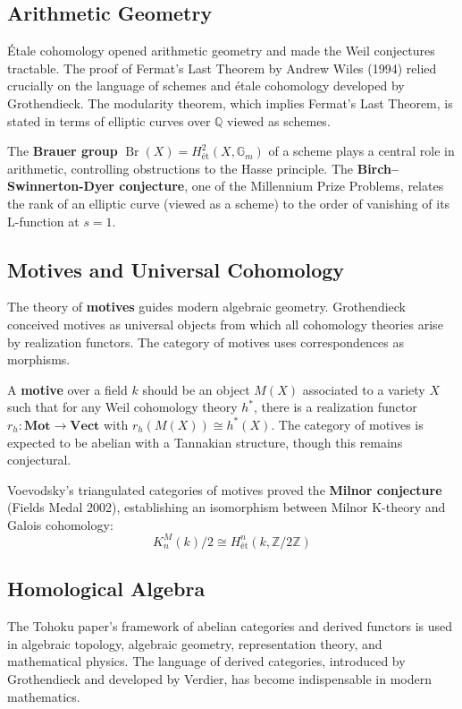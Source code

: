 \subsection*{Arithmetic Geometry}

Étale cohomology opened arithmetic geometry and made the Weil conjectures
tractable. The proof of Fermat's Last Theorem by Andrew Wiles (1994) relied
crucially on the language of schemes and étale cohomology developed by
Grothendieck. The modularity theorem, which implies Fermat's Last Theorem, is
stated in terms of elliptic curves over $\mathbb{Q}$ viewed as schemes.

The \textbf{Brauer group} $\operatorname{Br}(X) = H^2_{\text{ét}}(X, \mathbb{G}_m)$
of a scheme plays a central role in arithmetic, controlling obstructions to
the Hasse principle. The \textbf{Birch--Swinnerton-Dyer conjecture}, one of the
Millennium Prize Problems, relates the rank of an elliptic curve (viewed as a
scheme) to the order of vanishing of its L-function at $s=1$.

\subsection*{Motives and Universal Cohomology}

The theory of \textbf{motives} guides modern algebraic geometry. Grothendieck
conceived motives as universal objects from which all cohomology theories arise
by realization functors. The category of motives uses correspondences as
morphisms.

A \textbf{motive} over a field $k$ should be an object $M(X)$ associated to a
variety $X$ such that for any Weil cohomology theory $h^*$, there is a
realization functor $r_h: \mathbf{Mot} \to \mathbf{Vect}$ with
$r_h(M(X)) \cong h^*(X)$. The category of motives is expected to be abelian
with a Tannakian structure, though this remains conjectural.

Voevodsky's triangulated categories of motives proved the \textbf{Milnor
conjecture} (Fields Medal 2002), establishing an isomorphism between
Milnor K-theory and Galois cohomology:
\[
K_n^M(k)/2 \cong H^n_{\text{ét}}(k, \mathbb{Z}/2\mathbb{Z})
\]

\subsection*{Homological Algebra}

The Tohoku paper's framework of abelian categories and derived functors is used in
algebraic topology, algebraic geometry, representation theory, and mathematical
physics. The language of derived categories, introduced by Grothendieck and
developed by Verdier, has become indispensable in modern mathematics.


